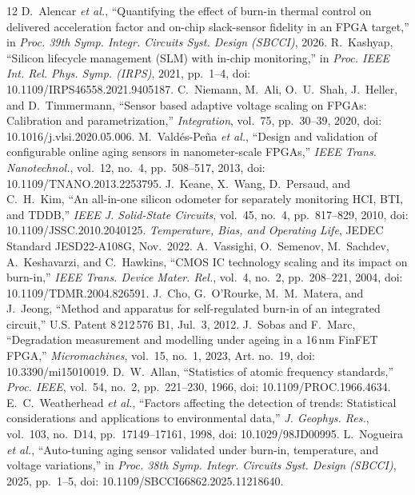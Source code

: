 \documentclass[10pt,twocolumn]{article}
\begin{document}
\renewcommand{\refname}{References}\begin{thebibliography}{12}
\footnotesize
{} D.~Alencar \emph{et al.}, ``Quantifying the effect of burn-in thermal control on delivered acceleration factor and on-chip slack-sensor fidelity in an FPGA target,'' in \emph{Proc. 39th Symp. Integr. Circuits Syst. Design (SBCCI)}, 2026.
 R.~Kashyap, ``Silicon lifecycle management (SLM) with in-chip monitoring,'' in \emph{Proc. IEEE Int. Rel. Phys. Symp. (IRPS)}, 2021, pp.~1--4, doi: 10.1109/IRPS46558.2021.9405187.
 C.~Niemann, M.~Ali, O.~U.~Shah, J.~Heller, and D.~Timmermann, ``Sensor based adaptive voltage scaling on FPGAs: Calibration and parametrization,'' \emph{Integration}, vol.~75, pp.~30--39, 2020, doi: 10.1016/j.vlsi.2020.05.006.
 M.~Vald\'es-Pe\~na \emph{et al.}, ``Design and validation of configurable online aging sensors in nanometer-scale FPGAs,'' \emph{IEEE Trans. Nanotechnol.}, vol.~12, no.~4, pp.~508--517, 2013, doi: 10.1109/TNANO.2013.2253795.
 J.~Keane, X.~Wang, D.~Persaud, and C.~H.~Kim, ``An all-in-one silicon odometer for separately monitoring HCI, BTI, and TDDB,'' \emph{IEEE J. Solid-State Circuits}, vol.~45, no.~4, pp.~817--829, 2010, doi: 10.1109/JSSC.2010.2040125.
 \emph{Temperature, Bias, and Operating Life}, JEDEC Standard JESD22-A108G, Nov.~2022.
 A.~Vassighi, O.~Semenov, M.~Sachdev, A.~Keshavarzi, and C.~Hawkins, ``CMOS IC technology scaling and its impact on burn-in,'' \emph{IEEE Trans. Device Mater. Rel.}, vol.~4, no.~2, pp.~208--221, 2004, doi: 10.1109/TDMR.2004.826591.
 J.~Cho, G.~O'Rourke, M.~M.~Matera, and J.~Jeong, ``Method and apparatus for self-regulated burn-in of an integrated circuit,'' U.S. Patent 8\,212\,576 B1, Jul.~3, 2012.
 J.~Sobas and F.~Marc, ``Degradation measurement and modelling under ageing in a 16\,nm FinFET FPGA,'' \emph{Micromachines}, vol.~15, no.~1, 2023, Art. no.~19, doi: 10.3390/mi15010019.
 D.~W.~Allan, ``Statistics of atomic frequency standards,'' \emph{Proc. IEEE}, vol.~54, no.~2, pp.~221--230, 1966, doi: 10.1109/PROC.1966.4634.
 E.~C.~Weatherhead \emph{et al.}, ``Factors affecting the detection of trends: Statistical considerations and applications to environmental data,'' \emph{J. Geophys. Res.}, vol.~103, no.~D14, pp.~17149--17161, 1998, doi: 10.1029/98JD00995.
 L.~Nogueira \emph{et al.}, ``Auto-tuning aging sensor validated under burn-in, temperature, and voltage variations,'' in \emph{Proc. 38th Symp. Integr. Circuits Syst. Design (SBCCI)}, 2025, pp.~1--5, doi: 10.1109/SBCCI66862.2025.11218640.
\end{thebibliography}
\end{document}
